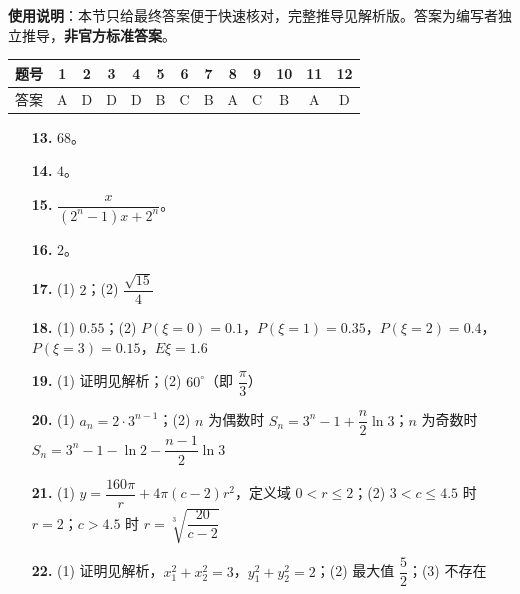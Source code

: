 
\begin{gknotice}
\textbf{使用说明}：本节只给最终答案便于快速核对，完整推导见解析版。答案为编写者独立推导，\textbf{非官方标准答案}。
\end{gknotice}

\begin{center}\begin{tabular}{ccccccccccccc}
\toprule
题号 & 1 & 2 & 3 & 4 & 5 & 6 & 7 & 8 & 9 & 10 & 11 & 12 \\
\midrule
答案 & A & D & D & D & B & C & B & A & C & B & A & D \\
\bottomrule
\end{tabular}\end{center}

\begin{itemize}[leftmargin=2.6em]
  \item[\textbf{13.}] $68$。
  \item[\textbf{14.}] $4$。
  \item[\textbf{15.}] $\dfrac{x}{(2^n-1)x+2^n}$。
  \item[\textbf{16.}] $2$。
\end{itemize}

\begin{itemize}[leftmargin=2.6em]
  \item[\textbf{17.}] (1) $2$；(2) $\dfrac{\sqrt{15}}{4}$
  \item[\textbf{18.}] (1) $0.55$；(2) $P(\xi=0)=0.1$，$P(\xi=1)=0.35$，$P(\xi=2)=0.4$，$P(\xi=3)=0.15$，$E\xi=1.6$
  \item[\textbf{19.}] (1) 证明见解析；(2) $60^\circ$（即 $\dfrac{\pi}{3}$）
  \item[\textbf{20.}] (1) $a_n=2\cdot3^{n-1}$；(2) $n$ 为偶数时 $S_n=3^n-1+\dfrac n2\ln3$；$n$ 为奇数时 $S_n=3^n-1-\ln2-\dfrac{n-1}{2}\ln3$
  \item[\textbf{21.}] (1) $y=\dfrac{160\pi}{r}+4\pi(c-2)r^2$，定义域 $0<r\leqslant2$；(2) $3<c\leqslant4.5$ 时 $r=2$；$c>4.5$ 时 $r=\sqrt[3]{\dfrac{20}{c-2}}$
  \item[\textbf{22.}] (1) 证明见解析，$x_1^2+x_2^2=3$，$y_1^2+y_2^2=2$；(2) 最大值 $\dfrac52$；(3) 不存在
\end{itemize}
